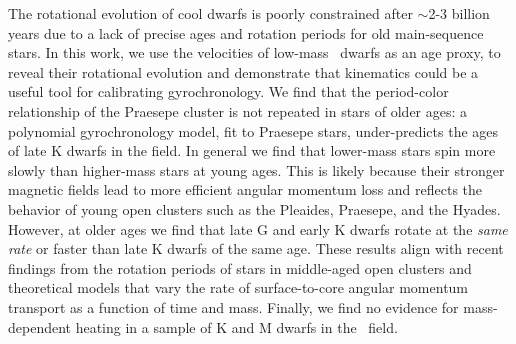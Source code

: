 
The rotational evolution of cool dwarfs is poorly constrained after $\sim$2-3
billion years due to a lack of precise ages and rotation periods for old
main-sequence stars.
In this work, we use the velocities of low-mass \kepler\ dwarfs as an age
proxy, to reveal their rotational evolution and demonstrate that kinematics
could be a useful tool for calibrating gyrochronology.
We find that the period-color relationship of the Praesepe cluster is not
repeated in stars of older ages: a polynomial gyrochronology model, fit to
Praesepe stars, under-predicts the ages of late K dwarfs in the field.
In general we find that lower-mass stars spin more slowly than higher-mass
stars at young ages.
This is likely because their stronger magnetic fields lead to more efficient
angular momentum loss and reflects the behavior of young open clusters such as
the Pleaides, Praesepe, and the Hyades.
However, at older ages we find that late G and early K dwarfs rotate at the
{\it same rate} or faster than late K dwarfs of the same age.
These results align with recent findings from the rotation periods of stars in
middle-aged open clusters and theoretical models that vary the rate of
surface-to-core angular momentum transport as a function of time and mass.
Finally, we find no evidence for mass-dependent heating in a sample of K and M
dwarfs in the \kepler\ field.

